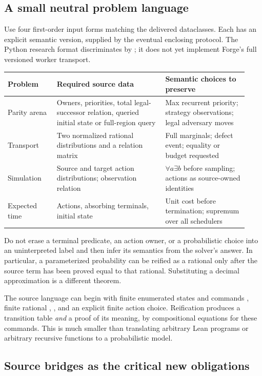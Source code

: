 \subsection{A small neutral problem language}

Use four first-order input forms matching the delivered dataclasses. Each has
an explicit semantic version, supplied by the eventual enclosing protocol.
The Python research format discriminates by ; it does not yet
implement Forge's full versioned worker transport.

\begin{longtable}{@{}L{0.19\linewidth}L{0.42\linewidth}L{0.32\linewidth}@{}}
\toprule
Problem & Required source data & Semantic choices to preserve \\
\midrule
\endhead
Parity arena & Owners, priorities, total legal-successor relation, queried
initial state or full-region query & Max recurrent priority; strategy
observations; legal adversary moves \\
Transport & Two normalized rational distributions and a relation matrix & Full
marginals; defect event; equality or budget requested \\
Simulation & Source and target action distributions; observation relation &
$\forall a\exists b$ before sampling; actions as source-owned identities \\
Expected time & Actions, absorbing terminals, initial state & Unit cost before
termination; supremum over all schedulers \\
\bottomrule
\end{longtable}

Do not erase a terminal predicate, an action owner, or a probabilistic choice
into an uninterpreted label and then infer its semantics from the solver's
answer. In particular, a parameterized probability can be reified as a rational
only after the source term has been proved equal to that rational. Substituting
a decimal approximation is a different theorem.

The source language can begin with finite enumerated states and commands
, finite rational , , and an explicit
finite action choice. Reification produces a transition table \emph{and} a
proof of its meaning, by compositional equations for these commands. This is
much smaller than translating arbitrary Lean programs or arbitrary recursive
functions to a probabilistic model.

\subsection{Source bridges as the critical new obligations}

